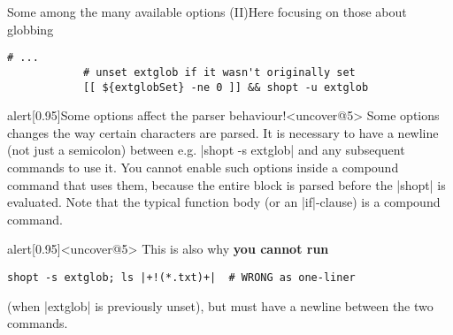 \begin{frame}[fragile]{Some among the many available options (II)}{Here focusing on those about globbing}
\begin{onlyenv}
\begin{lstlisting}[style=myBash, numbers=none, style=smaller]
            # ...
            # unset extglob if it wasn't originally set
            [[ ${extglobSet} -ne 0 ]] && shopt -u extglob
        \end{lstlisting}
        \begin{varblock}{alert}[0.95\textwidth]{Some options affect the parser behaviour!}<uncover@5>
            \footnotesize Some options changes the way certain characters are parsed.
            It is necessary to have a newline (not just a semicolon) between e.g. \bash|shopt -s extglob| and any subsequent commands to use it.
            \alert{You cannot enable such options inside a compound command that uses them}, because the entire block is parsed before the \bash|shopt| is evaluated.
            Note that the typical function body (or an \bash|if|-clause) is a compound command.
        \end{varblock}
        \vspace{-2mm}
        \begin{varblock*}{alert}[0.95\textwidth]{}<uncover@5>
            \footnotesize This is also why \alert{\textbf{you cannot run}}
            \begin{lstlisting}[style=myBash, numbers=none, belowskip=-6mm,aboveskip=2mm]
                shopt -s extglob; ls |+!(*.txt)+|  # WRONG as one-liner
            \end{lstlisting}
            (when \bash|extglob| is previously unset), but must have a newline between the two commands.
        \end{varblock*}
    \end{onlyenv}
\end{frame}
